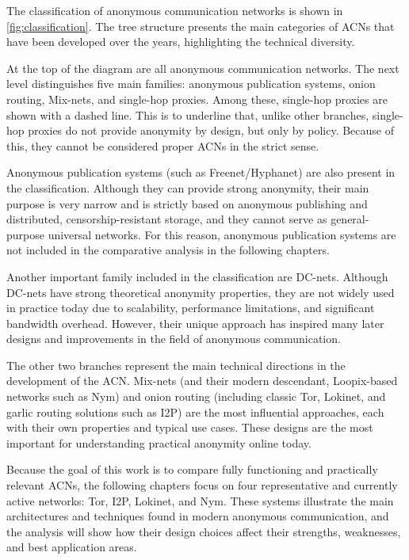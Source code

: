 The classification of anonymous communication networks is shown in \ref{fig:classification}. The tree structure presents the main categories of ACNs that have been developed over the years, highlighting the technical diversity.

At the top of the diagram are all anonymous communication networks. The next level distinguishes five main families: anonymous publication systems, onion routing, Mix-nets, and single-hop proxies. Among these, single-hop proxies are shown with a dashed line. This is to underline that, unlike other branches, single-hop proxies do not provide anonymity by design, but only by policy. Because of this, they cannot be considered proper ACNs in the strict sense.

Anonymous publication systems (such as Freenet/Hyphanet) are also present in the classification. Although they can provide strong anonymity, their main purpose is very narrow and is strictly based on anonymous publishing and distributed, censorship-resistant storage, and they cannot serve as general-purpose universal networks. For this reason, anonymous publication systems are not included in the comparative analysis in the following chapters.

Another important family included in the classification are DC-nets. Although DC-nets have strong theoretical anonymity properties, they are not widely used in practice today due to scalability, performance limitations, and significant bandwidth overhead. However, their unique approach has inspired many later designs and improvements in the field of anonymous communication.

The other two branches represent the main technical directions in the development of the ACN. Mix-nets (and their modern descendant, Loopix-based networks such as Nym) and onion routing (including classic Tor, Lokinet, and garlic routing solutions such as I2P) are the most influential approaches, each with their own properties and typical use cases. These designs are the most important for understanding practical anonymity online today.

Because the goal of this work is to compare fully functioning and practically relevant ACNs, the following chapters focus on four representative and currently active networks: Tor, I2P, Lokinet, and Nym. These systems illustrate the main architectures and techniques found in modern anonymous communication, and the analysis will show how their design choices affect their strengths, weaknesses, and best application areas.

